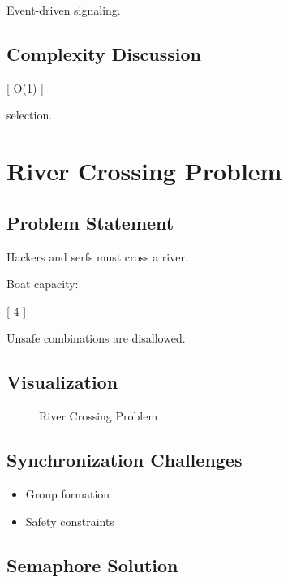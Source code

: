 Event-driven signaling.

\subsection{Complexity Discussion}

[
O(1)
]

selection.

\section{River Crossing Problem}

\subsection{Problem Statement}

Hackers and serfs must cross a river.

Boat capacity:

[
4
]

Unsafe combinations are disallowed.

\subsection{Visualization}

\begin{figure}[H]
\centering
{}
\caption{River Crossing Problem}
\end{figure}

\subsection{Synchronization Challenges}

\begin{itemize}
\item Group formation
\item Safety constraints
\end{itemize}

\subsection{Semaphore Solution}

